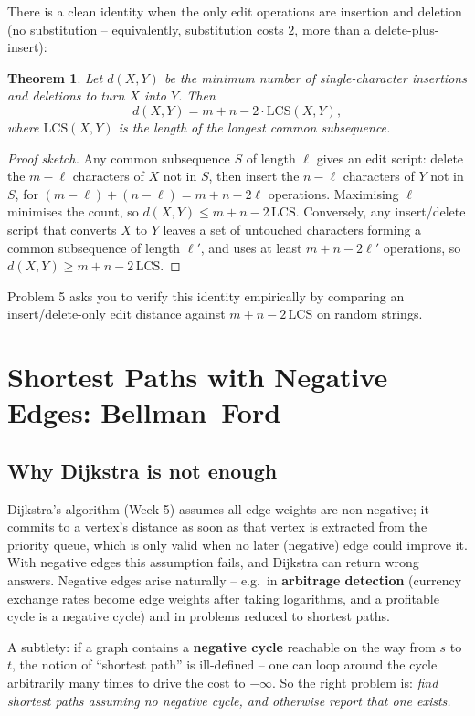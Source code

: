 \documentclass[11pt]{article}
\newtheorem{theorem}{Theorem}[section]
\begin{document}
There is a clean identity when the only edit operations are insertion and deletion (no
substitution -- equivalently, substitution costs $2$, more than a delete-plus-insert):
\begin{theorem}
\label{thm:lcs-edit}
Let $d(X,Y)$ be the minimum number of single-character insertions and deletions to turn $X$
into $Y$. Then
\[
d(X,Y) = m + n - 2 \cdot \mathrm{LCS}(X,Y),
\]
where $\mathrm{LCS}(X,Y)$ is the length of the longest common subsequence.
\end{theorem}
\begin{proof}[Proof sketch]
Any common subsequence $S$ of length $\ell$ gives an edit script: delete the $m - \ell$
characters of $X$ not in $S$, then insert the $n - \ell$ characters of $Y$ not in $S$, for
$(m-\ell) + (n-\ell) = m + n - 2\ell$ operations. Maximising $\ell$ minimises the count, so
$d(X,Y) \le m + n - 2\,\mathrm{LCS}$. Conversely, any insert/delete script that converts $X$
to $Y$ leaves a set of untouched characters forming a common subsequence of length
$\ell'$, and uses at least $m+n-2\ell'$ operations, so $d(X,Y) \ge m+n-2\,\mathrm{LCS}$.
\end{proof}
Problem 5 asks you to verify this identity empirically by comparing an insert/delete-only
edit distance against $m + n - 2\,\mathrm{LCS}$ on random strings.

\section{Shortest Paths with Negative Edges: Bellman--Ford}

\subsection{Why Dijkstra is not enough}

Dijkstra's algorithm (Week 5) assumes all edge weights are non-negative; it commits to a
vertex's distance as soon as that vertex is extracted from the priority queue, which is only
valid when no later (negative) edge could improve it. With negative edges this assumption
fails, and Dijkstra can return wrong answers. Negative edges arise naturally -- e.g.\ in
\textbf{arbitrage detection} (currency exchange rates become edge weights after taking
logarithms, and a profitable cycle is a negative cycle) and in problems reduced to shortest
paths.

A subtlety: if a graph contains a \textbf{negative cycle} reachable on the way from $s$ to
$t$, the notion of ``shortest path'' is ill-defined -- one can loop around the cycle
arbitrarily many times to drive the cost to $-\infty$. So the right problem is: \emph{find
shortest paths assuming no negative cycle, and otherwise report that one exists.}
\end{document}
